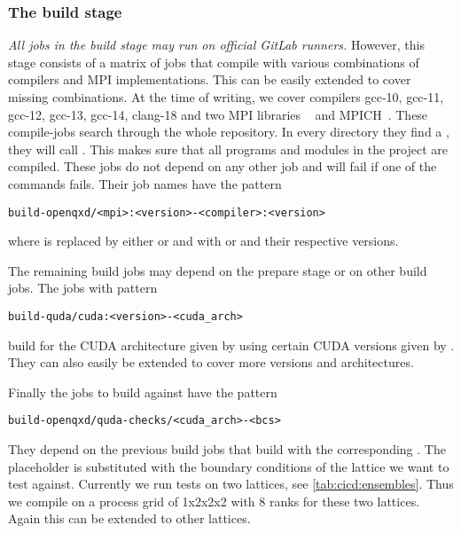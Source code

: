 \subsubsection{The build stage}
\label{sec:cicd:pipeline:gitlab:build}

\emph{All jobs in the build stage may run on official GitLab runners.}
However, this stage consists of a matrix of jobs that compile \openqxd with various combinations of compilers and MPI implementations.
This can be easily extended to cover missing combinations.
At the time of writing, we cover compilers gcc-10, gcc-11, gcc-12, gcc-13, gcc-14, clang-18 and two MPI libraries \openmpi~\cite{online:openmpi} and MPICH~\cite{online:mpich}.
These compile-jobs search through the whole repository.
In every directory they find a , they will call .
This makes sure that all programs and modules in the project are compiled.
These jobs do not depend on any other job and will fail if one of the  commands fails.
Their job names have the pattern
\begin{verbatim}
build-openqxd/<mpi>:<version>-<compiler>:<version>
\end{verbatim}
where  is replaced by either  or  and  with  or  and their respective versions.

The remaining build jobs may depend on the prepare stage or on other build jobs.
The jobs with pattern
\begin{verbatim}
build-quda/cuda:<version>-<cuda_arch>
\end{verbatim}
build \quda for the CUDA architecture given by  using certain CUDA versions given by . 
They can also easily be extended to cover more versions and architectures.

Finally the jobs to build \openqxd against \quda have the pattern
\begin{verbatim}
build-openqxd/quda-checks/<cuda_arch>-<bcs>
\end{verbatim}
They depend on the previous build jobs that build \quda with the corresponding .
The placeholder  is substituted with the boundary conditions of the lattice we want to test against.
Currently we run tests on two lattices, see \cref{tab:cicd:ensembles}.
Thus we compile \openqxd on a process grid of 1x2x2x2 with 8 ranks for these two lattices.
Again this can be extended to other lattices.

